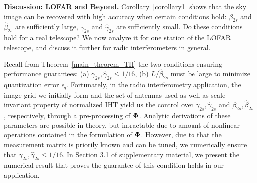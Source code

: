 \documentclass{article}
\begin{document}
{\bf Discussion: LOFAR and Beyond.}
Corollary~\ref{corollary1} shows that the sky image 
can be recovered with high accuracy when certain conditions  hold:
${\beta}_{2s}$ and $\hat{\beta}_{2s}$ are sufficiently large, ${\gamma}_{2s}$ and $\hat{\gamma}_{2s}$
are sufficiently small. Do these conditions hold for a real telescope? We now analyze it for one station of the LOFAR telescope, and discuss it further for radio interferometers in general.

 Recall from Theorem~\ref{main_theorem_TH} the two conditions ensuring  performance guarantees: (a) $\gamma_{2s}, \hat{\gamma}_{2s} \leq 1/16$, (b) ${L}/{\hat{\beta}_{2s}}$ must be large to minimize quantization error $ {\epsilon}_q$. Fortunately, in the radio interferometry application, the image grid we initially form and the set of antennas used as well as scale-invariant property of normalized IHT yield us the control over $\gamma_{2s}, \hat{\gamma}_{2s}$ and ${\beta}_{2s}, \hat{\beta}_{2s}$, respectively, through a pre-processing of ${\bf \Phi}$. Analytic derivations of these parameters are possible in theory, but intractable due to amount of nonlinear operations contained in the formulation of ${\bf \Phi}$. However, due to that the measurement matrix is priorily known and can be tuned, we numerically ensure that ${\gamma}_{2s}, \hat{\gamma}_{2s}\leq 1/16$. In Section 3.1 of supplementary material, we present the numerical result that proves the guarantee of this condition holds in our application.
 
\end{document}
